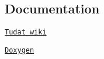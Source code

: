 \subsection*{Documentation}


\begin{DoxyItemize}
\item \href{http://tudat.tudelft.nl/projects/tudat/wiki}{\tt Tudat wiki}
\item \href{http://tudat.tudelft.nl/Doxygen/Tudat/docs/index.html}{\tt Doxygen} 
\end{DoxyItemize}